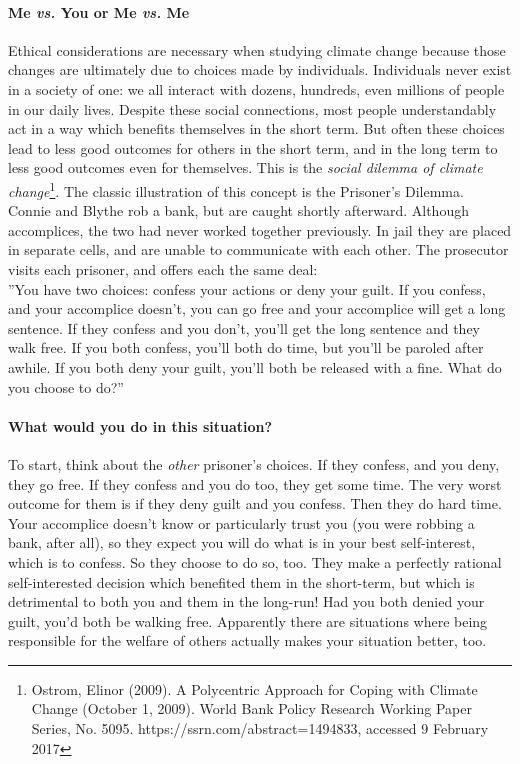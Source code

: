 \paragraph{Me \textit{vs.} You or Me \textit{vs.} Me}
Ethical considerations are necessary when studying climate change because those changes are ultimately due to choices made by individuals. Individuals never exist in a society of one: we all interact with dozens, hundreds, even millions of people in our daily lives. Despite these social connections, most people understandably act in a way which benefits themselves in the short term. But often these choices lead to less good outcomes for others in the short term, and in the long term to less good outcomes even for themselves. This is the \emph{social dilemma of climate change}\footnote{Ostrom, Elinor (2009). A Polycentric Approach for Coping with Climate Change (October 1, 2009). World Bank Policy Research Working Paper Series, No. 5095. https://ssrn.com/abstract=1494833, accessed 9 February 2017}. The classic illustration of this concept is the Prisoner's Dilemma.\\

Connie and Blythe rob a bank, but are caught shortly afterward. Although accomplices, the two had never worked together previously. In jail they are placed in separate cells, and are unable to communicate with each other. The prosecutor visits each prisoner, and offers each the same deal:\\

''You have two choices: confess your actions or deny your guilt. If you confess, and your accomplice doesn't, you can go free and your accomplice will get a long sentence. If they confess and you don't, you'll get the long sentence and they walk free. If you both confess, you'll both do time, but you'll be paroled after awhile. If you both deny your guilt, you'll both be released with a fine. What do you choose to do?''\\

\paragraph{What would you do in this situation?} To start, think about the \emph{other} prisoner's choices. If they confess, and you deny, they go free. If they confess and you do too, they get some time. The very worst outcome for them is if they deny guilt and you confess. Then they do hard time. Your accomplice doesn't know or particularly trust you (you were robbing a bank, after all), so they expect you will do what is in your best self-interest, which is to confess. So they choose to do so, too. They make a perfectly rational self-interested decision which benefited them in the short-term, but which is detrimental to both you and them in the long-run! Had you both denied your guilt, you'd both be walking free. Apparently there are situations where being responsible for the welfare of others actually makes your situation better, too.\\

